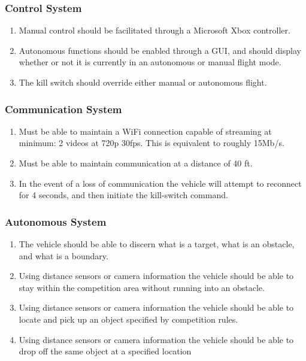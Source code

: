 \documentclass[onecolumn, draftclsnofoot,10pt, compsoc]{IEEEtran}
\begin{document}
\subsubsection{Control System}
\begin{enumerate}
\item Manual control should be facilitated through a Microsoft Xbox controller. 

\item Autonomous functions should be enabled through a GUI, and should display whether or not it is currently in an autonomous or manual flight mode. 

\item The kill switch should override either manual or autonomous flight.


\end{enumerate}
\subsubsection{Communication System}
\begin{enumerate}
\item Must be able to maintain a WiFi connection capable of streaming at minimum: 2 videos at 720p 30fps. This is equivalent to roughly 15Mb/s.

\item Must be able to maintain communication at a distance of 40 ft.

\item In the event of a loss of communication the vehicle will attempt to reconnect for 4 seconds, and then initiate the kill-switch command.


\end{enumerate}
\subsubsection{Autonomous System}
\begin{enumerate}
\item The vehicle should be able to discern what is a target, what is an obstacle, and what is a boundary.
\item Using distance sensors or camera information the vehicle should be able to stay within the competition area without running into an obstacle. 
\item Using distance sensors or camera information the vehicle should be able to locate and pick up an object specified by competition rules\cite{r2}.
\item Using distance sensors or camera information the vehicle should be able to drop off the same object at a specified location


\end{enumerate}
\end{document}
